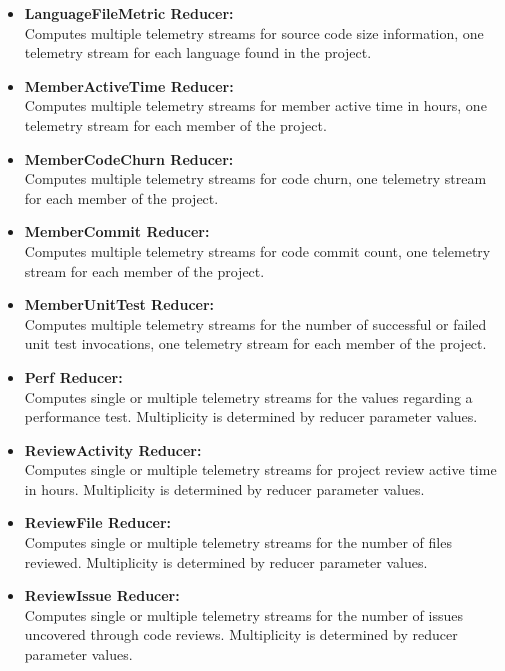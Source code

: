 \begin{itemize}
	\item \textbf{LanguageFileMetric Reducer:}\\
Computes multiple telemetry streams for source code size information, one telemetry stream for each language found in the project.

	\item \textbf{MemberActiveTime Reducer:}\\
Computes multiple telemetry streams for member active time in hours, one telemetry stream for each member of the project.

	\item \textbf{MemberCodeChurn Reducer:}\\
Computes multiple telemetry streams for code churn, one telemetry stream for each member of the project.

	\item \textbf{MemberCommit Reducer:}\\
Computes multiple telemetry streams for code commit count, one telemetry stream for each member of the project.

	\item \textbf{MemberUnitTest Reducer:}\\
Computes multiple telemetry streams for the number of successful or failed unit test invocations, one telemetry stream for each member of the project.

	\item \textbf{Perf Reducer:}\\
Computes single or multiple telemetry streams for the values regarding a
performance test. Multiplicity is determined by reducer parameter values.

	\item \textbf{ReviewActivity Reducer:}\\
Computes single or multiple telemetry streams for project review active time in hours. Multiplicity is determined by reducer parameter values.

	\item \textbf{ReviewFile Reducer:}\\
Computes single or multiple telemetry streams for the number of files reviewed. Multiplicity is determined by reducer parameter values.

	\item \textbf{ReviewIssue Reducer:}\\
Computes single or multiple telemetry streams for the number of issues uncovered through code reviews. Multiplicity is determined by reducer parameter values.


\end{itemize}
